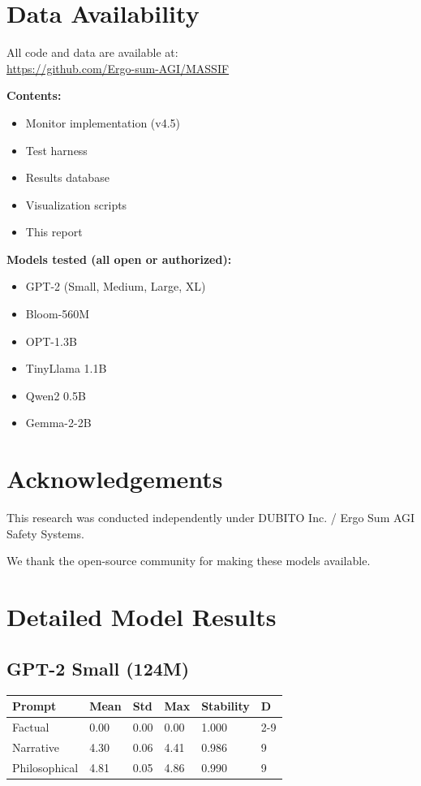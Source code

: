 \documentclass[12pt,a4paper]{article}
\begin{document}
\section*{Data Availability}

All code and data are available at:\\
\url{https://github.com/Ergo-sum-AGI/MASSIF}

\noindent
\textbf{Contents:}
\begin{itemize}[noitemsep]
    \item Monitor implementation (v4.5)
    \item Test harness
    \item Results database
    \item Visualization scripts
    \item This report
\end{itemize}

\noindent
\textbf{Models tested (all open or authorized):}
\begin{itemize}[noitemsep]
    \item GPT-2 (Small, Medium, Large, XL)
    \item Bloom-560M
    \item OPT-1.3B
    \item TinyLlama 1.1B
    \item Qwen2 0.5B
    \item Gemma-2-2B
\end{itemize}

\section*{Acknowledgements}

This research was conducted independently under DUBITO Inc. / Ergo Sum AGI Safety Systems.

We thank the open-source community for making these models available.

\newpage

\appendix

\section{Detailed Model Results}

\subsection{GPT-2 Small (124M)}

\begin{table}[h]
\centering
\begin{tabular}{llllll}
\toprule
\textbf{Prompt} & \textbf{Mean} & \textbf{Std} & \textbf{Max} & \textbf{Stability} & \textbf{D} \\
\midrule
Factual & 0.00 & 0.00 & 0.00 & 1.000 & 2-9 \\
Narrative & 4.30 & 0.06 & 4.41 & 0.986 & 9 \\
Philosophical & 4.81 & 0.05 & 4.86 & 0.990 & 9 \\
\bottomrule
\end{tabular}
\end{table}
\end{document}
